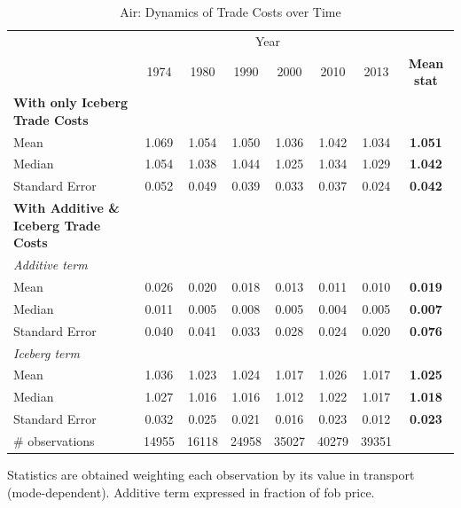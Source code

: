 \documentclass[a4paper,11pt]{article}
\begin{document}
\begin{table}[htbp]
  \centering
  \caption{Air: Dynamics of Trade Costs over Time}
\begin{center}
    \begin{tabular}{lccccccc}

   \hline\hline
          & \multicolumn{6}{c}{Year}                      &  \\

          & 1974  & 1980  & 1990  & 2000  & 2010  & 2013  & \multicolumn{1}{c}{\textbf{Mean stat}} \\
 \hline
\multicolumn{1}{l}{\textbf{With only Iceberg Trade Costs}} &       &       &       &       &       &       & \multicolumn{1}{c}{\textbf{}} \\
Mean  & 1.069 & 1.054 & 1.050 & 1.036 & 1.042 & 1.034 & \multicolumn{1}{c}{\textbf{1.051}} \\
Median & 1.054 & 1.038 & 1.044 & 1.025 & 1.034 & 1.029 & \multicolumn{1}{c}{\textbf{1.042}} \\
Standard Error & 0.052 & 0.049 & 0.039 & 0.033 & 0.037 & 0.024 & \multicolumn{1}{c}{\textbf{0.042}}\\
\hline
\multicolumn{1}{l}{\textbf{With Additive \& Iceberg Trade Costs }} &       &       &       &       &       &       & \multicolumn{1}{c}{\textbf{}}\\
\multicolumn{1}{l}{\textit{Additive term }} &       &       &       &       &       &       & \multicolumn{1}{c}{\textbf{}} \\
\multicolumn{1}{l}{Mean } & 0.026 & 0.020 & 0.018 & 0.013 & 0.011 & 0.010 & \multicolumn{1}{c}{\textbf{0.019}} \\
\multicolumn{1}{l}{Median} & 0.011 & 0.005 & 0.008 & 0.005 & 0.004 & 0.005 & \multicolumn{1}{c}{\textbf{0.007}} \\
\multicolumn{1}{l}{Standard Error} & 0.040 & 0.041 & 0.033 & 0.028 & 0.024 & 0.020 & \multicolumn{1}{c}{\textbf{0.076}} \\
\multicolumn{1}{l}{\textit{Iceberg term}} &       &       &       &       &       &       & \multicolumn{1}{c}{\textbf{}} \\
\multicolumn{1}{l}{Mean } & 1.036 & 1.023 & 1.024 & 1.017 & 1.026 & 1.017 & \multicolumn{1}{c}{\textbf{1.025}} \\
\multicolumn{1}{l}{Median} & 1.027 & 1.016 & 1.016 & 1.012 & 1.022 & 1.017 & \multicolumn{1}{c}{\textbf{1.018}} \\
Standard Error & 0.032 & 0.025 & 0.021 & 0.016 & 0.023 & 0.012 & \multicolumn{1}{c}{\textbf{0.023}} \\
\hline
\# observations & 14955 & 16118 & 24958 & 35027 & 40279 & 39351 & \textbf{} \\

\hline\hline
    \end{tabular}%
  \end{center}
  \label{tab:result_air}%
\tiny{Statistics are obtained weighting each observation by its value in transport (mode-dependent). Additive term expressed in fraction of fob price. }
\end{table}%
\end{document}
